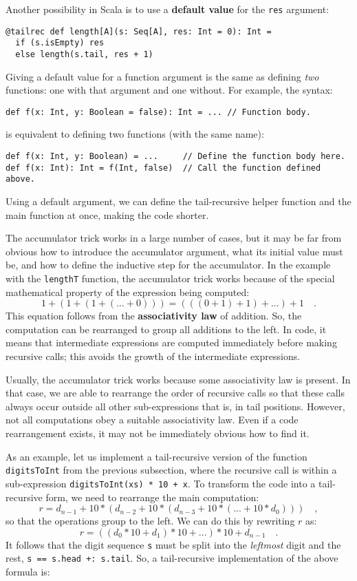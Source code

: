 Another possibility in Scala is to use a \textbf{default value}
for the \lstinline!res! argument:
\begin{lstlisting}
@tailrec def length[A](s: Seq[A], res: Int = 0): Int = 
  if (s.isEmpty) res
  else length(s.tail, res + 1)
\end{lstlisting}
Giving a default value for a function argument is the same as defining
\emph{two} functions: one with that argument and one without. For
example, the syntax:
\begin{lstlisting}
def f(x: Int, y: Boolean = false): Int = ... // Function body.
\end{lstlisting}
is equivalent to defining two functions (with the same name):
\begin{lstlisting}
def f(x: Int, y: Boolean) = ...     // Define the function body here.
def f(x: Int): Int = f(Int, false)  // Call the function defined above.
\end{lstlisting}
Using a default argument, we can define the tail-recursive helper
function and the main function at once, making the code shorter.

The accumulator trick works in a large number of cases, but it may
be far from obvious how to introduce the accumulator argument, what
its initial value must be, and how to define the inductive step for
the accumulator. In the example with the \lstinline!lengthT! function,
the accumulator trick works because of the special mathematical property
of the expression being computed:
\[
1+\left(1+\left(1+\left(...+0\right)\right)\right)=\left(\left(\left(0+1\right)+1\right)+...\right)+1\quad.
\]
This equation follows from the \textbf{associativity
law} of addition. So, the computation can be rearranged to group all
additions to the left. In code, it means that intermediate expressions
are computed immediately before making recursive calls; this avoids
the growth of the intermediate expressions. 

Usually, the accumulator trick works because some associativity law
is present. In that case, we are able to rearrange the order of recursive
calls so that these calls always occur outside all other sub-expressions
\textemdash{} that is, in tail positions. However, not all computations
obey a suitable associativity law. Even if a code rearrangement exists,
it may not be immediately obvious how to find it.

As an example, let us implement a tail-recursive version of the function
\lstinline!digitsToInt! from the previous subsection, where the recursive
call is within a sub-expression \lstinline!digitsToInt(xs) * 10 + x!.
To transform the code into a tail-recursive form, we need to rearrange
the main computation:
\[
r=d_{n-1}+10*\left(d_{n-2}+10*\left(d_{n-3}+10*\left(...+10*d_{0}\right)\right)\right)\quad,
\]
so that the operations group to the left. We can do this by rewriting
$r$ as:
\[
r=\left(\left(d_{0}*10+d_{1}\right)*10+...\right)*10+d_{n-1}\quad.
\]
It follows that the digit sequence \lstinline!s! must be split into
the \emph{leftmost} digit and the rest, \lstinline!s == s.head +: s.tail!.
So, a tail-recursive implementation of the above formula is:

